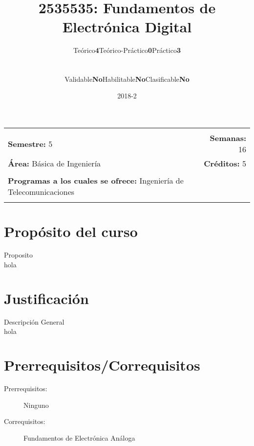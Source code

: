 \documentclass[11pt]{article}
\title{2535535: Fundamentos de Electrónica Digital}
\author{\begin{tabular} {c|c|c|c|c|c} Teórico & \textbf{4} & Teórico-Práctico & \textbf{0} & Práctico & \textbf{3}\end{tabular}
\\
\begin{tabular} {c|c|c|c|c|c} Validable & \textbf{No} & Habilitable & \textbf{No} & Clasificable & \textbf{No}\end{tabular}}
\date{2018-2}
\newcommand{\blankline}{\quad\pagebreak[2]}
\begin{document}
\maketitle

\begin{tabular*}{.93\textwidth}{@{\extracolsep{\fill}}lr}
\hline\\

\textbf{Semestre:} 5 & \textbf{Semanas:} 16
\\
\textbf{Área:} Básica de Ingeniería &    \textbf{Créditos:} 5 
\\ & \\
\textbf{Programas a los cuales se ofrece:} Ingeniería de Telecomunicaciones
\\ & \\
\hline
\end{tabular*}

\vspace{5 mm}

\section*{Propósito del curso}

Proposito
\\hola



\section*{Justificación}

Descripción General
\\hola

\section*{Prerrequisitos/Correquisitos}
\begin{description}
\item [Prerrequisitos:] Ninguno
\item[Correquisitos:] Fundamentos de Electrónica Análoga
\end{description}
\end{document}
